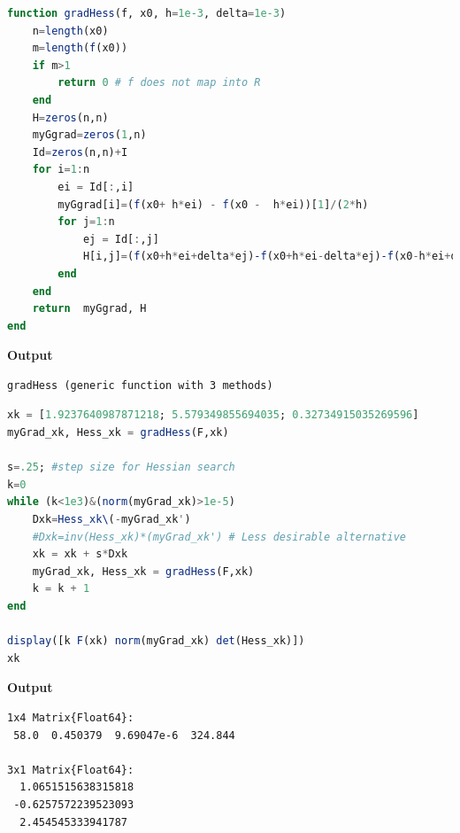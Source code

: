 \begin{lstlisting}[language=Julia,style=mystyle]
function gradHess(f, x0, h=1e-3, delta=1e-3) 
    n=length(x0)
    m=length(f(x0))
    if m>1
        return 0 # f does not map into R
    end        
    H=zeros(n,n)
    myGgrad=zeros(1,n)
    Id=zeros(n,n)+I
    for i=1:n
        ei = Id[:,i]
        myGgrad[i]=(f(x0+ h*ei) - f(x0 -  h*ei))[1]/(2*h)
        for j=1:n
            ej = Id[:,j]
            H[i,j]=(f(x0+h*ei+delta*ej)-f(x0+h*ei-delta*ej)-f(x0-h*ei+delta*ej)+f(x0-h*ei-delta*ej))[1]/(4*h*delta)
        end
    end
    return  myGgrad, H
end
\end{lstlisting}
\textbf{Output} 
\begin{verbatim}
gradHess (generic function with 3 methods)
\end{verbatim}

\begin{lstlisting}[language=Julia,style=mystyle]
xk = [1.9237640987871218; 5.579349855694035; 0.32734915035269596]
myGrad_xk, Hess_xk = gradHess(F,xk)

s=.25; #step size for Hessian search 
k=0
while (k<1e3)&(norm(myGrad_xk)>1e-5)
    Dxk=Hess_xk\(-myGrad_xk')
    #Dxk=inv(Hess_xk)*(myGrad_xk') # Less desirable alternative
    xk = xk + s*Dxk
    myGrad_xk, Hess_xk = gradHess(F,xk)
    k = k + 1
end

display([k F(xk) norm(myGrad_xk) det(Hess_xk)])
xk 
\end{lstlisting}
\textbf{Output} 
\begin{verbatim}
1x4 Matrix{Float64}:
 58.0  0.450379  9.69047e-6  324.844
 
3x1 Matrix{Float64}:
  1.0651515638315818
 -0.6257572239523093
  2.454545333941787
\end{verbatim}



